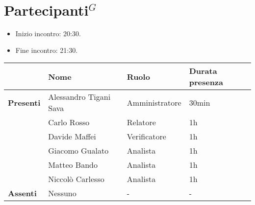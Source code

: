 \section*{\gls{Partecipanti}$^G$}

\begin{itemize}
	\item Inizio incontro: 20:30.
	\item Fine incontro: 21:30.
\end{itemize}


\begin{center}
	\begin{tabular}{llll}
		                  & \textbf{Nome}          & \textbf{Ruolo} & \textbf{Durata presenza} \\
		\hline
		\textbf{Presenti} & Alessandro Tigani Sava & Amministratore & 30min                    \\
		                  & Carlo Rosso            & Relatore       & 1h                       \\
		                  & Davide Maffei          & Verificatore   & 1h                       \\
		                  & Giacomo Gualato        & Analista       & 1h                       \\
		                  & Matteo Bando           & Analista       & 1h                       \\
		                  & Niccolò Carlesso       & Analista       & 1h                       \\
		\hline
		\textbf{Assenti}  & Nessuno                & -              & -                        \\
	\end{tabular}
\end{center}

